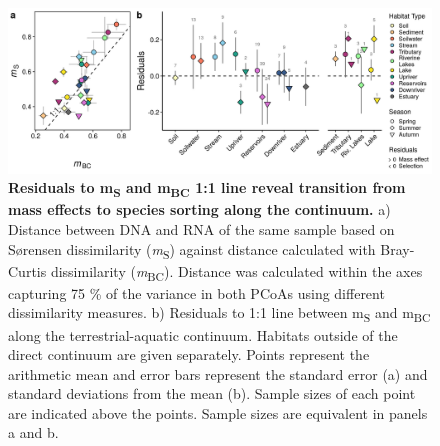 \documentclass[12pt,a4paper]{article} %
\begin{document}
\begin{figure}[!ht]
\centering
\includegraphics[width=15cm]{../../Figures/Final/distBCS_residcontinuum.png}
\caption{\textbf{Residuals to m\textsubscript{S} and m\textsubscript{BC} 1:1 line reveal transition from mass effects to species sorting along the continuum.} a) Distance between DNA and RNA of the same sample based on S{\o}rensen dissimilarity (\textit{m}\textsubscript{S}) against distance calculated with Bray-Curtis dissimilarity (\textit{m}\textsubscript{BC}). Distance was calculated within the axes capturing 75 \% of the variance in both PCoAs using different dissimilarity measures. b) Residuals to 1:1 line between m\textsubscript{S} and m\textsubscript{BC} along the terrestrial-aquatic continuum. Habitats outside of the direct continuum are given separately. Points represent the arithmetic mean and error bars represent the standard error (a) and standard deviations from the mean (b). Sample sizes of each point are indicated above the points. Sample sizes are equivalent in panels a and b.}
\end{figure}
\end{document}

